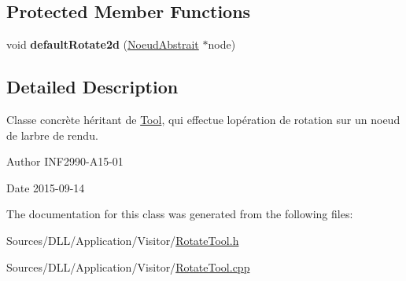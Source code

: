 \subsection*{Protected Member Functions}
\begin{DoxyCompactItemize}
\item 
\hypertarget{group__inf2990_ga3d7a6452fd82b9684e5e24ed3aeef6b5}{}void {\bfseries default\+Rotate2d} (\hyperlink{class_noeud_abstrait}{Noeud\+Abstrait} $\ast$node)\label{group__inf2990_ga3d7a6452fd82b9684e5e24ed3aeef6b5}

\end{DoxyCompactItemize}


\subsection{Detailed Description}
Classe concrète héritant de \hyperlink{class_tool}{Tool}, qui effectue l\textquotesingle{}opération de rotation sur un noeud de l\textquotesingle{}arbre de rendu. 

\begin{DoxyAuthor}{Author}
I\+N\+F2990-\/\+A15-\/01 
\end{DoxyAuthor}
\begin{DoxyDate}{Date}
2015-\/09-\/14 
\end{DoxyDate}


The documentation for this class was generated from the following files\+:\begin{DoxyCompactItemize}
\item 
Sources/\+D\+L\+L/\+Application/\+Visitor/\hyperlink{_rotate_tool_8h}{Rotate\+Tool.\+h}\item 
Sources/\+D\+L\+L/\+Application/\+Visitor/\hyperlink{_rotate_tool_8cpp}{Rotate\+Tool.\+cpp}\end{DoxyCompactItemize}
